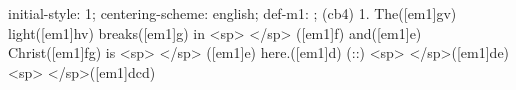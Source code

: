 initial-style: 1;
centering-scheme: english;
def-m1: \grealign;
(cb4) 1. The([em1]gv) light([em1]hv) breaks([em1]g) in <sp> </sp> ([em1]f) and([em1]e) Christ([em1]fg) is <sp> </sp> ([em1]e) here.([em1]d) (::) <sp> </sp>([em1]de)<sp> </sp>([em1]dcd)